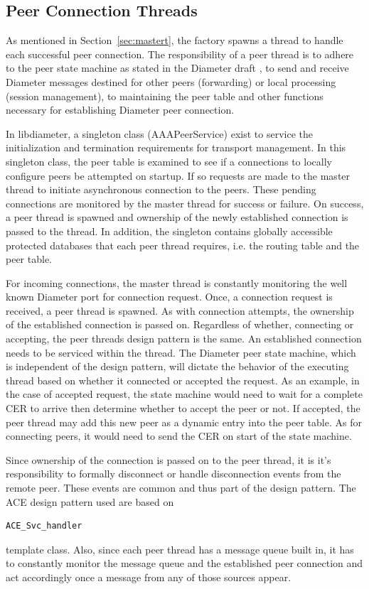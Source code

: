 \documentclass{article}
\begin{document}
\subsection{Peer Connection Threads\label{sec:peert}}

As mentioned in Section~\ref{sec:mastert}, the factory spawns a thread
to handle each successful peer connection. The responsibility of a peer
thread is to adhere to the peer state machine as stated in the Diameter
draft \cite{basep}, to send and receive Diameter messages destined for
other peers (forwarding) or local processing (session management), to
maintaining the peer table and other functions necessary for
establishing Diameter peer connection.

In libdiameter, a singleton class (AAAPeerService) exist to service the
initialization and termination requirements for transport management. In
this singleton class, the peer table is examined to see if a connections
to locally configure peers be attempted on startup. If so requests are
made to the master thread to initiate asynchronous connection to the
peers. These pending connections are monitored by the master thread for
success or failure. On success, a peer thread is spawned and ownership
of the newly established connection is passed to the thread. In
addition, the singleton contains globally accessible protected databases
that each peer thread requires, i.e. the routing table and the peer
table.

For incoming connections, the master thread is constantly monitoring the
well known Diameter port for connection request. Once, a connection
request is received, a peer thread is spawned. As with connection
attempts, the ownership of the established connection is passed
on. Regardless of whether, connecting or accepting, the peer threads
design pattern is the same. An established connection needs to be
serviced within the thread. The Diameter peer state machine, which is
independent of the design pattern, will dictate the behavior of the
executing thread based on whether it connected or accepted the
request. As an example, in the case of accepted request, the state
machine would need to wait for a complete CER to arrive then determine
whether to accept the peer or not. If accepted, the peer thread may add
this new peer as a dynamic entry into the peer table. As for connecting
peers, it would need to send the CER on start of the state machine.

Since ownership of the connection is passed on to the peer thread, it is
it's responsibility to formally disconnect or handle disconnection
events from the remote peer. These events are common and thus part of
the design pattern. The ACE design pattern used are based on
\begin{verbatim}ACE_Svc_handler\end{verbatim} template class. Also,
since each peer thread has a message queue built in, it has to
constantly monitor the message queue and the established peer connection
and act accordingly once a message from any of those sources appear.
\end{document}
